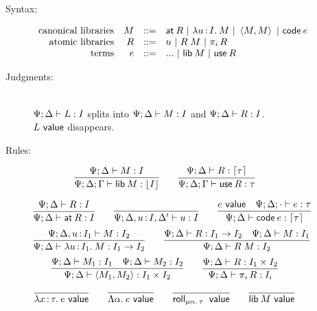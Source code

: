 \documentclass[11pt]{article}
\begin{document}

\begin{figure}
  \centering
  \begin{description}
    \item[Syntax:]
      \[\begin{array}{rrcl}
        \text{canonical libraries} &
        M &::=& \textsf{at}\:{R} ~|~ \lambda u \mathop{:} I .\: M ~|~ \left\langle M,M\right\rangle ~|~ \textsf{code}\:{e}\\
        \text{atomic libraries} & R &::=& u ~|~ R \; M ~|~ \pi_{i} \, R\\
        \text{terms} & e &::=& ... ~|~ \textsf{lib}\:{M} ~|~ \textsf{use}\:{R}
      \end{array}\]

    \item[Judgments:]\hfill\\
      $\Psi;\Delta \vdash L : I$ splits into $\Psi;\Delta \vdash M : I$ and $\Psi;\Delta
      \vdash R : I$.\\
      $L ~\textsf{value}$ disappears.

    \item[Rules:]
      \[
      \infer{\Psi;\D;\G \ent \lib{M} \isa \dn{I}}{\Psi;\D \ent M \isa I} \qquad
      \infer{\Psi;\D;\G \ent \use{R} \isa \tau}{\Psi;\D \ent R \isa \up{\tau}}
      \]

      \[
      \infer{\Psi;\D \ent \at{R} \isa I}{\Psi;\D \ent R \isa I} \qquad
      \infer{\Psi;\D,u \of I,\D' \ent u \isa I}{} \qquad
      \infer{\Psi;\D \ent \code{e} \isa \up{\tau}}{
        e \isval &
        \Psi;\D;\ecx \ent e \isa \tau}
      \]\[
      \infer{\Psi;\D \ent \lam{u}{I_1}{M} \isa I_1 \to I_2}{
        \Psi;\D, u \of I_1 \ent M \isa I_2}
      \qquad
      \infer{\Psi;\D \ent R \ap M \isa I_2}{
        \Psi;\D \ent R \isa I_1 \to I_2 &
        \Psi;\D \ent M \isa I_1}
      \]\[
      \infer{\Psi;\D \ent \<M_1, M_2\> \isa I_1 \x I_2}{
        \Psi;\D \ent M_1 \isa I_1 &
        \Psi;\D \ent M_2 \isa I_2} \qquad
      \infer{\Psi;\D \ent \proj{i}{R} \isa I_i}{
        \Psi;\D \ent R \isa I_1 \x I_2}
      \]

      \[
      \infer{\lam{x}{\tau}{e} \isval}{} \qquad
      \infer{\Lam{\alpha}{e} \isval}{} \qquad
      \infer{\roll{\alpha}{\tau} \isval}{} \qquad
      \infer{\lib{M} \isval}{}
      \]


\end{description}
\end{figure}
\end{document}

